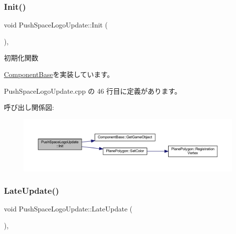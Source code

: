 \subsubsection{\texorpdfstring{Init()}{Init()}}
{\footnotesize\ttfamily void Push\+Space\+Logo\+Update\+::\+Init (\begin{DoxyParamCaption}{ }\end{DoxyParamCaption})\hspace{0.3cm}{\ttfamily [override]}, {\ttfamily [virtual]}}



初期化関数 



\mbox{\hyperlink{class_component_base_a125939d6befe42f28886a6523e86b18b}{Component\+Base}}を実装しています。



 Push\+Space\+Logo\+Update.\+cpp の 46 行目に定義があります。

呼び出し関係図\+:\nopagebreak
\begin{figure}[H]
\begin{center}
\leavevmode
\includegraphics[width=350pt]{class_push_space_logo_update_a9c165604160c012b429c1db1d67ffb2a_cgraph}
\end{center}
\end{figure}
\mbox{\label{class_push_space_logo_update_a4423864fb22b1211e92a4317d0b70a44}} 
\subsubsection{\texorpdfstring{Late\+Update()}{LateUpdate()}}
{\footnotesize\ttfamily void Push\+Space\+Logo\+Update\+::\+Late\+Update (\begin{DoxyParamCaption}{ }\end{DoxyParamCaption})\hspace{0.3cm}{\ttfamily [override]}, {\ttfamily [virtual]}}



